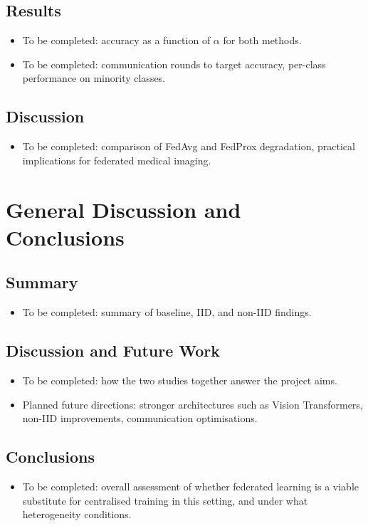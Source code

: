 \documentclass[12pt,openany,a4paper]{book}
\begin{document}
\section{Results}
\begin{itemize}
  \item To be completed: accuracy as a function of $\alpha$ for both methods.
  \item To be completed: communication rounds to target accuracy, per-class performance on minority classes.
\end{itemize}

\section{Discussion}
\begin{itemize}
  \item To be completed: comparison of FedAvg and FedProx degradation, practical implications for federated medical imaging.
\end{itemize}

\chapter{General Discussion and Conclusions}
\section{Summary}
\begin{itemize}
  \item To be completed: summary of baseline, IID, and non-IID findings.
\end{itemize}
\section{Discussion and Future Work}
\begin{itemize}
  \item To be completed: how the two studies together answer the project aims.
  \item Planned future directions: stronger architectures such as Vision Transformers, non-IID improvements, communication optimisations.
\end{itemize}
\section{Conclusions}
\begin{itemize}
  \item To be completed: overall assessment of whether federated learning is a viable substitute for centralised training in this setting, and under what heterogeneity conditions.
\end{itemize}
\end{document}
